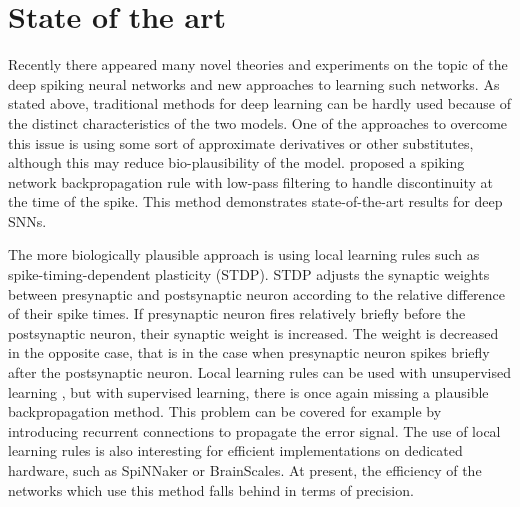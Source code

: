 \section{State of the art}
Recently there appeared many novel theories and experiments on the topic of the deep spiking neural networks and new approaches to learning such networks. As stated above, traditional methods for deep learning can be hardly used because of the distinct characteristics of the two models. One of the approaches to overcome this issue is using some sort of approximate derivatives or other substitutes, although this may reduce bio-plausibility of the model. \cite{leeTrainingDeepSpiking2016} proposed a spiking network backpropagation rule with low-pass filtering to handle discontinuity at the time of the spike. This method demonstrates state-of-the-art results for deep SNNs.\par
The more biologically plausible approach is using local learning rules such as spike-timing-dependent plasticity (STDP). STDP adjusts the synaptic weights between presynaptic and postsynaptic neuron according to the relative difference of their spike times. If presynaptic neuron fires relatively briefly before the postsynaptic neuron, their synaptic weight is increased. The weight is decreased in the opposite case, that is in the case when presynaptic neuron spikes briefly after the postsynaptic neuron. Local learning rules can be used with unsupervised learning \cite{tavanaeiDeepLearningSpiking2019}, but with supervised learning, there is once again missing a plausible backpropagation method. This problem can be covered for example by introducing recurrent connections to propagate the error signal. The use of local learning rules is also interesting for efficient implementations on dedicated hardware, such as SpiNNaker\cite{furberSpiNNakerProject14} or BrainScales. At present, the efficiency of the networks which use this method falls behind in terms of precision. \par
